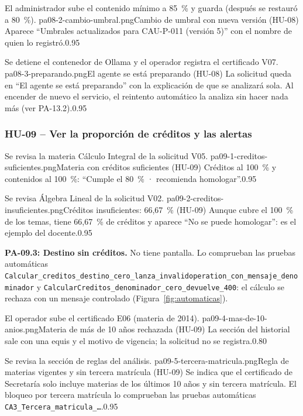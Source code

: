 {El administrador sube el contenido mínimo a 85~\% y guarda (después se restauró a 80~\%).}
{pa08-2-cambio-umbral.png}{Cambio de umbral con nueva versión (HU-08)}
{Aparece ``Umbrales actualizados para CAU-P-011 (versión 5)'' con el nombre de quien lo registró.}{0.95}

{Se detiene el contenedor de Ollama y el operador registra el certificado V07.}
{pa08-3-preparando.png}{El agente se está preparando (HU-08)}
{La solicitud queda en ``El agente se está preparando'' con la explicación de que se analizará sola. Al encender de
nuevo el servicio, el reintento automático la analiza sin hacer nada más (ver PA-13.2).}{0.95}

\subsubsection{HU-09 -- Ver la proporción de créditos y las alertas}

{Se revisa la materia Cálculo Integral de la solicitud V05.}
{pa09-1-creditos-suficientes.png}{Materia con créditos suficientes (HU-09)}
{Créditos al 100~\% y contenidos al 100~\%: ``Cumple el 80~\% · recomienda homologar''.}{0.95}

{Se revisa Álgebra Lineal de la solicitud V02.}
{pa09-2-creditos-insuficientes.png}{Créditos insuficientes: 66,67~\% (HU-09)}
{Aunque cubre el 100~\% de los temas, tiene 66,67~\% de créditos y aparece ``No se puede homologar'': es el ejemplo del
docente.}{0.95}

\textbf{PA-09.3: Destino sin créditos.} No tiene pantalla. Lo comprueban las pruebas automáticas
\texttt{Calcular\_creditos\_destino\_cero\_lanza\_invalidoperation\_con\_mensaje\_denominador} y
\texttt{CalcularCreditos\_denominador\_cero\_devuelve\_400}: el cálculo se rechaza con un mensaje controlado (Figura~\ref{fig:automaticas}).

{El operador sube el certificado E06 (materia de 2014).}
{pa09-4-mas-de-10-anios.png}{Materia de más de 10 años rechazada (HU-09)}
{La sección del historial sale con una equis y el motivo de vigencia; la solicitud no se registra.}{0.80}

{Se revisa la sección de reglas del análisis.}
{pa09-5-tercera-matricula.png}{Regla de materias vigentes y sin tercera matrícula (HU-09)}
{Se indica que el certificado de Secretaría solo incluye materias de los últimos 10 años y sin tercera matrícula. El
bloqueo por tercera matrícula lo comprueban las pruebas automáticas \texttt{CA3\_Tercera\_matricula\_\dots}.}{0.95}

